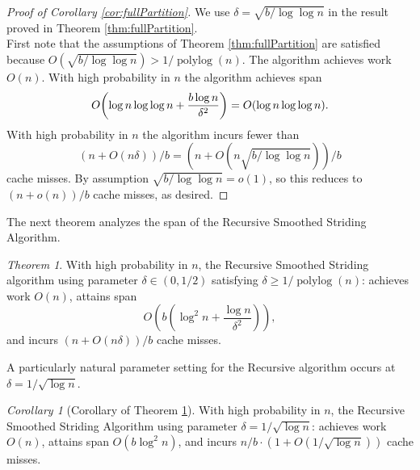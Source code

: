 \documentclass[sigplan, 10pt, nonacm]{acmart}
\DeclarePairedDelimiter{\paren}{(}{)}
\newcommand{\polylog}{\operatorname{polylog}}
\theoremstyle{remark}
\newtheorem{theorem}{Theorem}[section]
\newtheorem{corollary}[thm]{Corollary}
\theoremstyle{remark}
\begin{document}
\begin{proof}[Proof of Corollary \ref{cor:fullPartition}] We use $\delta = \sqrt{b/\log\log n}$ in the result proved in Theorem \ref{thm:fullPartition}. \\
	First note that the assumptions of Theorem \ref{thm:fullPartition} are satisfied because $O(\sqrt{b/\log\log n}) > 1 / \polylog(n).$
	The algorithm achieves work $O(n)$. 
	With high probability in $n$ the algorithm achieves span 
	$$O\paren*{\log n \log\log n +\frac{b\log n}{\delta^2}} = O(\log n\log\log n).$$
	With high probability in $n$ the algorithm incurs fewer than 
	$$(n+O(n\delta))/b = (n+O(n\sqrt{b/\log\log n}))/b$$ 
	cache misses.
	By assumption $\sqrt{b/\log\log n} = o(1)$, so this reduces to 
	$(n+o(n))/b$
	cache misses, as desired.
\end{proof}



The next theorem analyzes the span of the Recursive Smoothed Striding Algorithm.
\begin{theorem}
	\label{thm:groupedPartitionAlg}
	With high probability in $n$, the Recursive Smoothed Striding
        algorithm using parameter $\delta \in(0,1/2)$ satisfying
        $\delta \ge 1 / \polylog(n)$: achieves work $O(n)$, attains span
	$$O\left(b\left(\log^2 n + \frac{\log n}{\delta^2}\right)\right),$$
	and incurs $(n+O(n \delta))/b$ cache misses. 
\end{theorem}

A particularly natural parameter setting for the Recursive algorithm occurs at $\delta = 1 / \sqrt{\log n}$.
\begin{corollary}[Corollary of Theorem \ref{thm:groupedPartitionAlg}]
  \label{cor:groupedPartitionAlg}
	With high probability in $n$, the Recursive Smoothed Striding Algorithm using parameter $\delta=1/\sqrt{\log n}$:
  achieves work $O(n)$, attains span $O(b\log^2 n)$, and incurs $n/b \cdot (1 + O(1 / \sqrt{\log n}))$ cache misses. 
\end{corollary}
\end{document}
